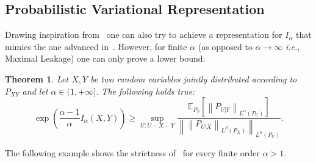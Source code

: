 \documentclass{article}
\newtheorem{theorem}{Theorem}
\numberwithin{theorem}{section}
\numberwithin{example}{section}
\numberwithin{remark}{section}
\numberwithin{definition}{section}
\begin{document}
\subsection{Probabilistic Variational Representation}
Drawing inspiration from~\cite{MaximalLeakage:20} one can also try to achieve a representation for $I_\alpha$ that mimics the one advanced in~. However, for finite $\alpha$ (as opposed to $\alpha\to\infty$ \textit{i.e.}, Maximal Leakage) one can only prove a lower bound:
\begin{theorem}\label{thm:markovChainRepresentation}
    Let $X,Y$ be two random variables jointly distributed according to $P_{XY}$ and let $\alpha\in (1,+\infty]$. The following holds true: \begin{equation}
    \exp\left(\frac{\alpha-1}{\alpha}I_\alpha(X,Y)\right) \geq \sup_{U:U-X-Y}  \frac{\mathbb{E}_{P_Y}\left[\left\lVert P_{U|Y}\right\rVert_{L^\alpha(P_U)}\right]}{\left\lVert\left\lVert P_{U|X}\right\rVert_{L^\beta(P_X)}\right\rVert_{L^\alpha(P_U)}}.\label{eq:varRepresProb}
\end{equation}
\end{theorem}
The following example shows the strictness of~ for every finite order $\alpha>1$.
\end{document}
